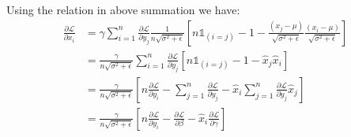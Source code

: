 \documentclass[12]{article}
\newcommand{\myskip}{0.7em}
\begin{document}
\begin{enumerate}[label=\textbf{(\alph*)}]
\[		\]
		Using the relation in above summation we have:
		\[
		\begin{aligned}
			\frac{\partial \mathcal{L}}{\partial x_i} &= \gamma \sum_{i=1}^n \frac{\partial \mathcal{L}}{\partial y_j}\frac{1}{n\sqrt{\sigma^2+\epsilon}} \left[n\mathds{1}_{(i=j)} - 1 - \frac{(x_j-\mu)}{\sqrt{\sigma^2 + \epsilon}}\frac{(x_i-\mu)}{\sqrt{\sigma^2 + \epsilon}}\right] \\[\myskip]
				&= \frac{\gamma}{n\sqrt{\sigma^2 + \epsilon}} \sum_{i=1}^n \frac{\partial \mathcal{L}}{\partial y_j} \left[n\mathds{1}_{(i=j)} - 1 - \hat{x}_j\hat{x}_i\right] \\[\myskip]
				&= \frac{\gamma}{n\sqrt{\sigma^2 + \epsilon}} \left[n\frac{\partial \mathcal{L}}{\partial y_i} - \sum_{j=1}^n \frac{\partial \mathcal{L}}{\partial y_j} - \hat{x}_i \sum_{j=1}^n\frac{\partial \mathcal{L}}{\partial y_j}\hat{x}_j\right] \\[\myskip]
				&= \boxed{\frac{\gamma}{n\sqrt{\sigma^2 + \epsilon}} \left[n\frac{\partial \mathcal{L}}{\partial y_i} - \frac{\partial \mathcal{L}}{\partial \beta} - \hat{x}_i\frac{\partial\mathcal{L}}{\partial \gamma}\right]}
		\end{aligned}
		\]
	\end{enumerate}
	
	\pagebreak
\end{document}
